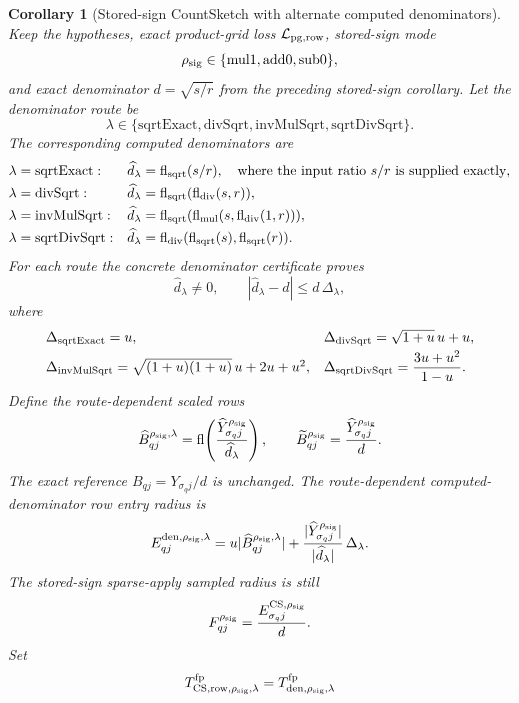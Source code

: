 \documentclass[11pt]{article}
\newcommand{\fl}{\operatorname{fl}}
\newtheorem{corollary}[theorem]{Corollary}
\theoremstyle{remark}
\begin{document}
\begin{corollary}[Stored-sign CountSketch with alternate computed denominators]
Keep the hypotheses, exact product-grid loss \(\mathcal L_{\rm pg,row}\),
stored-sign mode
\[
  \rho_{\rm sig}\in\{\mathrm{mul1},\mathrm{add0},\mathrm{sub0}\},
\]
and exact denominator \(d=\sqrt{s/r}\) from the preceding stored-sign
corollary.  Let the denominator route be
\[
  \lambda\in
  \{\mathrm{sqrtExact},\mathrm{divSqrt},
    \mathrm{invMulSqrt},\mathrm{sqrtDivSqrt}\}.
\]
The corresponding computed denominators are
\[
\begin{array}{@{}ll@{}}
\lambda=\mathrm{sqrtExact}:&
  \widehat d_\lambda=\fl_{\rm sqrt}(s/r),
  \quad\text{where the input ratio }s/r\text{ is supplied exactly},\\[1mm]
\lambda=\mathrm{divSqrt}:&
  \widehat d_\lambda=\fl_{\rm sqrt}(\fl_{\rm div}(s,r)),\\[1mm]
\lambda=\mathrm{invMulSqrt}:&
  \widehat d_\lambda=\fl_{\rm sqrt}(\fl_{\rm mul}(s,\fl_{\rm div}(1,r))),\\[1mm]
\lambda=\mathrm{sqrtDivSqrt}:&
  \widehat d_\lambda=\fl_{\rm div}(\fl_{\rm sqrt}(s),\fl_{\rm sqrt}(r)).
\end{array}
\]
For each route the concrete denominator certificate proves
\[
  \widehat d_\lambda\ne0,\qquad
  |\widehat d_\lambda-d|\le d\,\Delta_\lambda,
\]
where
\[
\begin{array}{@{}ll@{}}
\Delta_{\mathrm{sqrtExact}}=u,&
\Delta_{\mathrm{divSqrt}}=\sqrt{1+u}\,u+u,\\[1mm]
\Delta_{\mathrm{invMulSqrt}}=\sqrt{(1+u)(1+u)}\,u+2u+u^2,&
\Delta_{\mathrm{sqrtDivSqrt}}=\dfrac{3u+u^2}{1-u}.
\end{array}
\]
Define the route-dependent scaled rows
\[
  \widehat B^{\rho_{\rm sig},\lambda}_{qj}
  =
  \fl\!\left(
    \frac{\widehat Y^{\rho_{\rm sig}}_{\sigma_qj}}
         {\widehat d_\lambda}
  \right),
  \qquad
  \widetilde B^{\rho_{\rm sig}}_{qj}
  =
  \frac{\widehat Y^{\rho_{\rm sig}}_{\sigma_qj}}{d}.
\]
The exact reference \(B_{qj}=Y_{\sigma_qj}/d\) is unchanged.  The
route-dependent computed-denominator row entry radius is
\[
  E^{{\rm den},\rho_{\rm sig},\lambda}_{qj}
  =
  u|\widehat B^{\rho_{\rm sig},\lambda}_{qj}|
  +
  \frac{|\widehat Y^{\rho_{\rm sig}}_{\sigma_qj}|}
       {|\widehat d_\lambda|}\,\Delta_\lambda .
\]
The stored-sign sparse-apply sampled radius is still
\[
  F^{\rho_{\rm sig}}_{qj}
  =
  \frac{E^{{\rm CS},\rho_{\rm sig}}_{\sigma_qj}}{d}.
\]
Set
\[
  T_{{\rm CS,row},\rho_{\rm sig},\lambda}^{\rm fp}
  =
  T_{{\rm den},\rho_{\rm sig},\lambda}^{\rm fp}
\]
\end{corollary}
\end{document}

